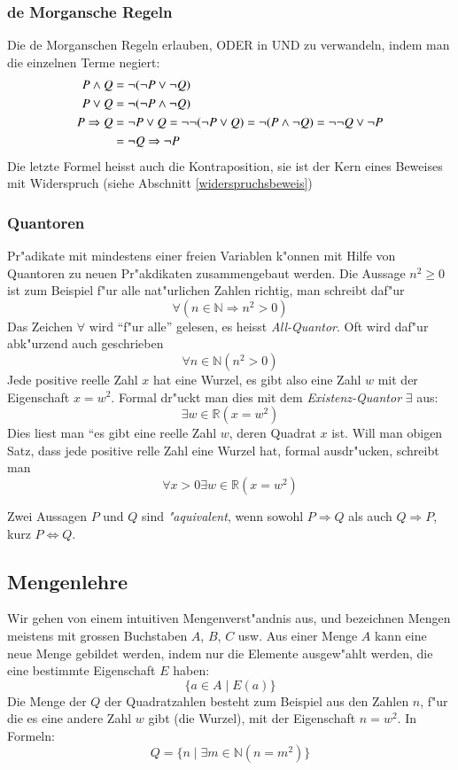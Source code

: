 \subsubsection{de Morgansche Regeln}
Die de Morganschen Regeln erlauben, ODER in UND zu verwandeln, indem
man die einzelnen Terme negiert:
\begin{align}
P\wedge Q&= \neg(\neg P\vee\neg Q)\notag\\
P\vee Q&= \neg(\neg P\wedge\neg Q)\notag\\
P\Rightarrow Q&=\neg P\vee Q=\neg\neg(\neg P\vee Q)=\neg(P\wedge\neg Q)=\neg\neg Q\vee \neg P\notag\\
&=\neg Q\Rightarrow \neg P\label{kontraposition}
\end{align}
Die letzte Formel heisst auch die Kontraposition, sie ist der Kern
eines Beweises mit Widerspruch (siehe Abschnitt \ref{widerspruchsbeweis})


\subsubsection{Quantoren}
Pr"adikate mit mindestens einer freien Variablen k"onnen mit Hilfe
von Quantoren zu neuen Pr"akdikaten zusammengebaut werden. 
Die Aussage $n^2\ge 0$ ist zum Beispiel f"ur alle nat"urlichen
Zahlen richtig, man schreibt daf"ur
\[
\forall (n\in\mathbb N\Rightarrow n^2>0)
\]
Das Zeichen $\forall$ wird ``f"ur alle'' gelesen, es heisst
{\em All-Quantor}.
Oft wird daf"ur abk"urzend auch geschrieben
\[
\forall n\in\mathbb N(n^2>0)
\]
Jede positive reelle Zahl $x$ hat eine Wurzel, es gibt also eine
Zahl $w$ mit der Eigenschaft $x=w^2$. Formal dr"uckt man dies mit
dem {\em Existenz-Quantor} $\exists$ aus:
\[
\exists w\in\mathbb R(x =w^2)
\]
Dies liest man ``es gibt eine reelle Zahl $w$, deren Quadrat $x$ ist.
Will man obigen Satz, dass jede positive relle Zahl eine Wurzel hat,
formal ausdr"ucken, schreibt man
\[
\forall x>0\exists w\in\mathbb R(x=w^2)
\]

Zwei Aussagen $P$ und $Q$ sind {\em "aquivalent}, wenn sowohl
$P\Rightarrow Q$ als auch $Q\Rightarrow P$, kurz $P\Leftrightarrow Q$.

\subsection{Mengenlehre}
Wir gehen von einem intuitiven Mengenverst"andnis aus, und bezeichnen
Mengen meistens mit grossen Buchstaben $A$, $B$, $C$ usw.
Aus einer Menge $A$ kann eine neue Menge gebildet werden, indem
nur die Elemente ausgew"ahlt werden, die eine bestimmte Eigenschaft
$E$ haben:
\[
\{a\in A\;|\;E(a)\}
\]
Die Menge der $Q$ der Quadratzahlen besteht zum Beispiel aus den
Zahlen $n$, f"ur
die es eine andere Zahl $w$ gibt (die Wurzel), mit der Eigenschaft
$n=w^2$.  In Formeln:
\[
Q=\{n\; |\; \exists m\in\mathbb N(n=m^2)\}
\]

